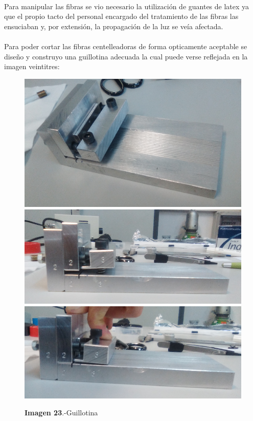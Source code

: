 \documentclass[11pt, a4paper]{article}
\begin{document}
\paragraph {}
Para manipular las fibras se vio necesario la utilización de guantes de latex ya que el propio tacto  del personal encargado del tratamiento de las fibras las ensuciaban y, por extensión, la propagación de la luz se veía afectada.

\paragraph {}
Para poder cortar las fibras centelleadoras de forma opticamente aceptable se diseño y construyo una guillotina adecuada la cual puede verse reflejada en la imagen veintitres:

\begin{figure}[htb]
\centering
{
\includegraphics[scale=0.2]{Guillotina1.png} 
}
{
\includegraphics[scale=0.2]{Guillotina2.png} 
}
{
\includegraphics[scale=0.2]{Guillotina3.png} 
}
\caption{\textbf{Imagen 23}.-Guillotina}
\end{figure} 
\end{document}
